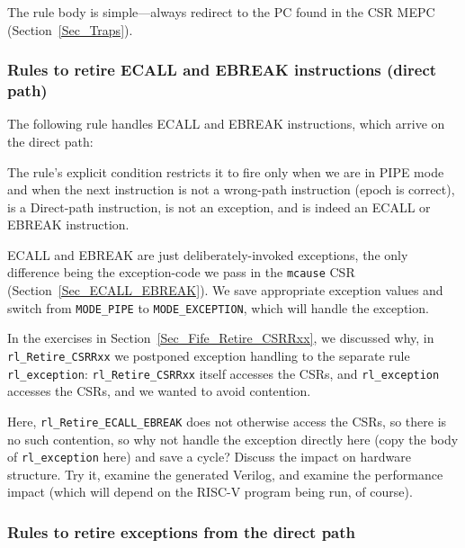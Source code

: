 The rule body is simple---always redirect to the PC found in the CSR
MEPC (Section~\ref{Sec_Traps}).


\subsubsection{Rules to retire ECALL and EBREAK instructions (direct path)}

The following rule handles ECALL and EBREAK instructions, which arrive on the direct path:



The rule's explicit condition restricts it to fire only when we are in
PIPE mode and when the next instruction is not a wrong-path
instruction (epoch is correct), is a Direct-path instruction, is not
an exception, and is indeed an ECALL or EBREAK instruction.

ECALL and EBREAK are just deliberately-invoked exceptions, the only
difference being the exception-code we pass in the \verb|mcause| CSR
(Section~\ref{Sec_ECALL_EBREAK}).  We save appropriate exception
values and switch from \verb|MODE_PIPE| to \verb|MODE_EXCEPTION|,
which will handle the exception.


\Exercise

In the exercises in Section~\ref{Sec_Fife_Retire_CSRRxx}, we discussed
why, in \verb|rl_Retire_CSRRxx| we postponed exception handling to the
separate rule \verb|rl_exception|: \verb|rl_Retire_CSRRxx| itself
accesses the CSRs, and \verb|rl_exception| accesses the CSRs, and we
wanted to avoid contention.

\vspace{1ex}

Here, \verb|rl_Retire_ECALL_EBREAK| does not otherwise access the
CSRs, so there is no such contention, so why not handle the exception
directly here (copy the body of \verb|rl_exception| here) and save a
cycle?  Discuss the impact on hardware structure.  Try it, examine the
generated Verilog, and examine the performance impact (which will
depend on the RISC-V program being run, of course).

\Endexercise


\subsubsection{Rules to retire exceptions from the direct path}

